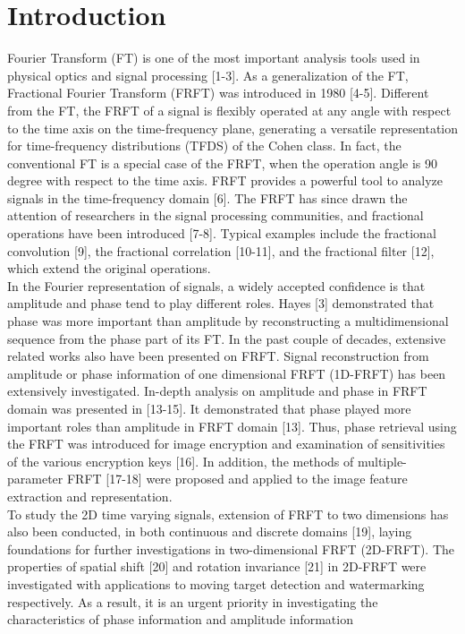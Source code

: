 \documentclass[journal]{IEEEtran}
\begin{document}
\section{Introduction}
%
%
%
%
 Fourier Transform (FT) is one of the most important analysis tools used in physical optics and signal processing [1-3]. As a generalization of the FT, Fractional Fourier Transform (FRFT) was introduced in 1980 [4-5]. Different from the FT, the FRFT of a signal is flexibly operated at any angle with respect to the time axis on the time-frequency plane, generating a versatile representation for time-frequency distributions (TFDS) of the Cohen class. In fact, the conventional FT is a special case of the FRFT, when the operation angle is 90 degree with respect to the time axis. FRFT provides a powerful tool to analyze signals in the time-frequency domain [6]. The FRFT has since drawn the attention of researchers in the signal processing communities, and fractional operations have been introduced [7-8]. Typical examples include the fractional convolution [9], the fractional correlation [10-11], and the fractional filter [12], which extend the original operations.\\\indent In the Fourier representation of signals, a widely accepted confidence is that amplitude and phase tend to play different roles. Hayes [3] demonstrated that phase was more important than amplitude by reconstructing a multidimensional sequence from the phase part of its FT. In the past couple of decades, extensive related works also have been presented on FRFT. Signal reconstruction from amplitude or phase information of one dimensional FRFT (1D-FRFT) has been extensively investigated. In-depth analysis on amplitude and phase in FRFT domain was presented in [13-15]. It demonstrated that phase played more important roles than amplitude in FRFT domain [13]. Thus, phase retrieval using the FRFT was introduced for image encryption and examination of sensitivities of the various encryption keys [16]. In addition, the methods of multiple-parameter FRFT [17-18] were proposed and applied to the image feature extraction and representation.\\\indent To study the 2D time varying signals, extension of FRFT to two dimensions has also been conducted, in both continuous and discrete domains [19], laying foundations for further investigations in two-dimensional FRFT (2D-FRFT). The properties of spatial shift [20] and rotation invariance [21] in 2D-FRFT were investigated with applications to moving target detection and watermarking respectively. As a result, it is an urgent priority in investigating the characteristics of phase information and amplitude information 
\end{document}
